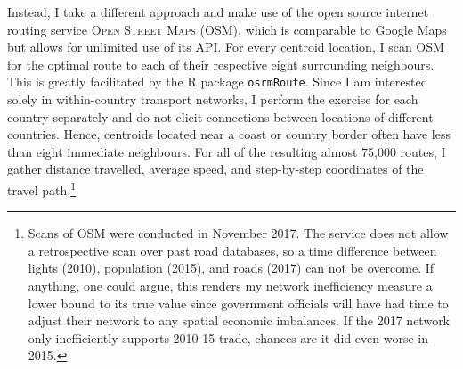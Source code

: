 \documentclass[11pt, oneside]{article}   	%
\begin{document}
Instead, I take a different approach and make use of the open source internet routing service \textsc{Open Street Maps} (OSM), which is comparable to Google Maps but allows for unlimited use of its API. For every centroid location, I scan OSM for the optimal route to each of their respective eight surrounding neighbours. This is greatly facilitated by the R package \texttt{osrmRoute}. Since I am interested solely in within-country transport networks, I perform the exercise for each country separately and do not elicit connections between locations of different countries. Hence, centroids located near a coast or country border often have less than eight immediate neighbours. For all of the resulting almost 75,000 routes, I gather distance travelled, average speed, and step-by-step coordinates of the travel path.\footnote{Scans of OSM were conducted in November 2017. The service does not allow a retrospective scan over past road databases, so a time difference between lights (2010), population (2015), and roads (2017) can not be overcome. If anything, one could argue, this renders my network inefficiency measure a lower bound to its true value since government officials will have had time to adjust their network to any spatial economic imbalances. If the 2017 network only inefficiently supports 2010-15 trade, chances are it did even worse in 2015.}
\end{document}
